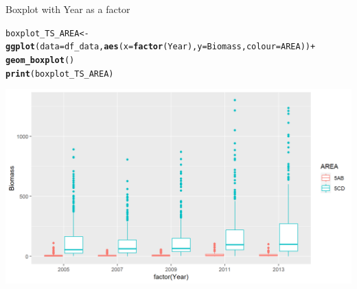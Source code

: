 \documentclass{beamer}\usepackage[]{graphicx}\usepackage[]{color}
\makeatletter
\newcommand{\hlopt}[1]{\textcolor[rgb]{0,0,0}{#1}}%
\newcommand{\hlstd}[1]{\textcolor[rgb]{0.345,0.345,0.345}{#1}}%
\newcommand{\hlkwb}[1]{\textcolor[rgb]{0.69,0.353,0.396}{#1}}%
\newcommand{\hlkwc}[1]{\textcolor[rgb]{0.333,0.667,0.333}{#1}}%
\newcommand{\hlkwd}[1]{\textcolor[rgb]{0.737,0.353,0.396}{\textbf{#1}}}%
\newenvironment{kframe}{%
 \def\at@end@of@kframe{}%
 \ifinner\ifhmode%
  \def\at@end@of@kframe{\end{minipage}}%
  \begin{minipage}{\columnwidth}%
 \fi\fi%
 \def\FrameCommand##1{\hskip\@totalleftmargin \hskip-\fboxsep
 \colorbox{shadecolor}{##1}\hskip-\fboxsep
     \hskip-\linewidth \hskip-\@totalleftmargin \hskip\columnwidth}%
 \MakeFramed {\advance\hsize-\width
   \@totalleftmargin\z@ \linewidth\hsize
   \@setminipage}}%
 {\par\unskip\endMakeFramed%
 \at@end@of@kframe}
\newenvironment{knitrout}{}{} %
\makeatother
\begin{document}
\begin{frame}[fragile]{Boxplot with Year as a factor}
\begin{knitrout}\footnotesize
{}\color{fgcolor}\begin{kframe}
\begin{alltt}
 \hlstd{boxplot_TS_AREA} \hlkwb{<-} \hlkwd{ggplot}\hlstd{(}\hlkwc{data}\hlstd{=df_data,} \hlkwd{aes}\hlstd{(}\hlkwc{x}\hlstd{=}\hlkwd{factor}\hlstd{(Year),} \hlkwc{y}\hlstd{=Biomass,} \hlkwc{colour}\hlstd{=AREA))} \hlopt{+}
   \hlkwd{geom_boxplot}\hlstd{()}
 \hlkwd{print}\hlstd{(boxplot_TS_AREA)}
\end{alltt}
\end{kframe}

{\centering \includegraphics[width=.9\linewidth]{figure/boxplot_TSf_AREA-1} 

}



\end{knitrout}
\end{frame}
\end{document}
